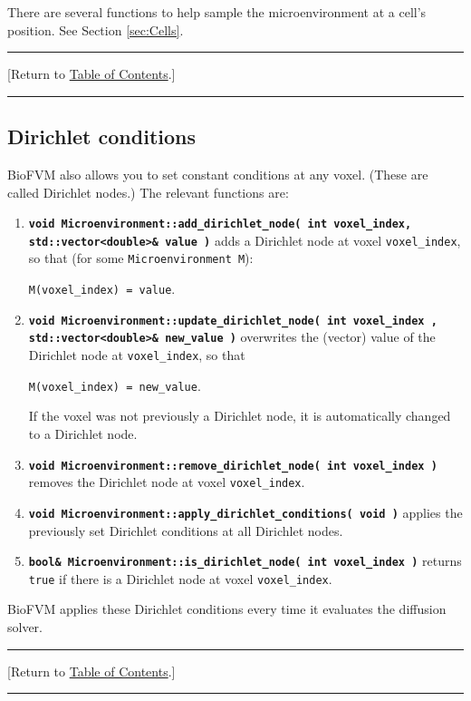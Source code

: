 \documentclass[12pt]{article}
\renewcommand{\v}{\verb}
\newcommand{\smallcode}[1]{\textbf{\texttt{#1}}}
\newcommand{\TOClink}{\begin{center}\hrule\vskip-10pt\phantom{.}\hfill[Return to \hyperlink{TOC}{Table of Contents}.]\hfill\phantom{.}\vskip3pt\hrule\end{center}}
\begin{document}
There are several functions to help sample the microenvironment  
at a cell's position. See Section \ref{sec:Cells}.


\TOClink 

\subsection{Dirichlet conditions}
\label{sec:Dirichlet}

BioFVM also allows you to set constant conditions at any 
voxel. (These are called Dirichlet nodes.) The relevant functions 
are: 

\begin{enumerate}
\item 
\smallcode{void Microenvironment::add\_dirichlet\_node( int voxel\_index, \\
\phantom{void } std::vector<double>\& value )} adds a Dirichlet node at voxel \v|voxel_index|, so that (for some \v|Microenvironment M|):

\v|M(voxel_index) = value|. 

\item 
\smallcode{void Microenvironment::update\_dirichlet\_node( int voxel\_index ,
 \\ \phantom{void }std::vector<double>\& new\_value )} overwrites the (vector) 
 value of the Dirichlet node at \v|voxel_index|, so that 

\v|M(voxel_index) = new_value|.  

If the voxel was not previously a Dirichlet node, it is automatically 
changed to a Dirichlet node. 

\item 
\smallcode{void Microenvironment::remove\_dirichlet\_node( int voxel\_index )} 
removes the Dirichlet node at voxel \v|voxel_index|. 

\item 
\smallcode{void Microenvironment::apply\_dirichlet\_conditions( void )} 
applies the previously set Dirichlet conditions at all Dirichlet nodes. 

\item
\smallcode{bool\& Microenvironment::is\_dirichlet\_node( int voxel\_index )} 
returns \v|true| if there is a Dirichlet node at voxel 
\v|voxel_index|. 
\end{enumerate}
 
BioFVM applies these Dirichlet conditions every time it 
evaluates the diffusion solver.

\TOClink
\end{document}
